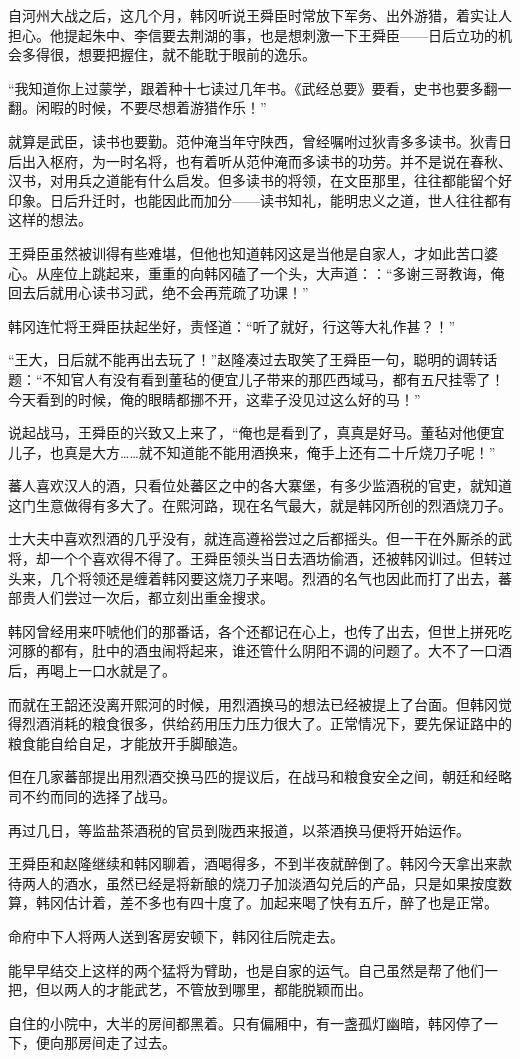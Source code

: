 自河州大战之后，这几个月，韩冈听说王舜臣时常放下军务、出外游猎，着实让人担心。他提起朱中、李信要去荆湖的事，也是想刺激一下王舜臣——日后立功的机会多得很，想要把握住，就不能耽于眼前的逸乐。

“我知道你上过蒙学，跟着种十七读过几年书。《武经总要》要看，史书也要多翻一翻。闲暇的时候，不要尽想着游猎作乐！”

就算是武臣，读书也要勤。范仲淹当年守陕西，曾经嘱咐过狄青多多读书。狄青日后出入枢府，为一时名将，也有着听从范仲淹而多读书的功劳。并不是说在春秋、汉书，对用兵之道能有什么启发。但多读书的将领，在文臣那里，往往都能留个好印象。日后升迁时，也能因此而加分——读书知礼，能明忠义之道，世人往往都有这样的想法。

王舜臣虽然被训得有些难堪，但他也知道韩冈这是当他是自家人，才如此苦口婆心。从座位上跳起来，重重的向韩冈磕了一个头，大声道：：“多谢三哥教诲，俺回去后就用心读书习武，绝不会再荒疏了功课！”

韩冈连忙将王舜臣扶起坐好，责怪道：“听了就好，行这等大礼作甚？！”

“王大，日后就不能再出去玩了！”赵隆凑过去取笑了王舜臣一句，聪明的调转话题：“不知官人有没有看到董毡的便宜儿子带来的那匹西域马，都有五尺挂零了！今天看到的时候，俺的眼睛都挪不开，这辈子没见过这么好的马！”

说起战马，王舜臣的兴致又上来了，“俺也是看到了，真真是好马。董毡对他便宜儿子，也真是大方……就不知道能不能用酒换来，俺手上还有二十斤烧刀子呢！”

蕃人喜欢汉人的酒，只看位处蕃区之中的各大寨堡，有多少监酒税的官吏，就知道这门生意做得有多大了。在熙河路，现在名气最大，就是韩冈所创的烈酒烧刀子。

士大夫中喜欢烈酒的几乎没有，就连高遵裕尝过之后都摇头。但一干在外厮杀的武将，却一个个喜欢得不得了。王舜臣领头当日去酒坊偷酒，还被韩冈训过。但转过头来，几个将领还是缠着韩冈要这烧刀子来喝。烈酒的名气也因此而打了出去，蕃部贵人们尝过一次后，都立刻出重金搜求。

韩冈曾经用来吓唬他们的那番话，各个还都记在心上，也传了出去，但世上拼死吃河豚的都有，肚中的酒虫闹将起来，谁还管什么阴阳不调的问题了。大不了一口酒后，再喝上一口水就是了。

而就在王韶还没离开熙河的时候，用烈酒换马的想法已经被提上了台面。但韩冈觉得烈酒消耗的粮食很多，供给药用压力压力很大了。正常情况下，要先保证路中的粮食能自给自足，才能放开手脚酿造。

但在几家蕃部提出用烈酒交换马匹的提议后，在战马和粮食安全之间，朝廷和经略司不约而同的选择了战马。

再过几日，等监盐茶酒税的官员到陇西来报道，以茶酒换马便将开始运作。

王舜臣和赵隆继续和韩冈聊着，酒喝得多，不到半夜就醉倒了。韩冈今天拿出来款待两人的酒水，虽然已经是将新酿的烧刀子加淡酒勾兑后的产品，只是如果按度数算，韩冈估计着，差不多也有四十度了。加起来喝了快有五斤，醉了也是正常。

命府中下人将两人送到客房安顿下，韩冈往后院走去。

能早早结交上这样的两个猛将为臂助，也是自家的运气。自己虽然是帮了他们一把，但以两人的才能武艺，不管放到哪里，都能脱颖而出。

自住的小院中，大半的房间都黑着。只有偏厢中，有一盏孤灯幽暗，韩冈停了一下，便向那房间走了过去。

